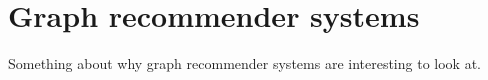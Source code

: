 \section{Graph recommender systems}
Something about why graph recommender systems are interesting to look at.
